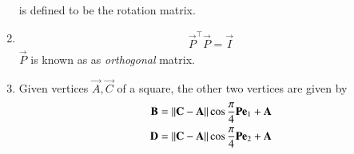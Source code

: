 \begin{enumerate}[label=\thesubsection.\arabic*.,ref=\thesubsection.\theenumi]
\begin{align}
{}
\end{align}
is defined to be the rotation matrix. 
\item 
\begin{align}
	\vec{P}^{\top} \vec{P} = \vec{I}
\end{align}
		$\vec{P}$ is known as as {\em orthogonal} matrix.
\item Given vertices $\vec{A}, \vec{C}$ of a square, the other two vertices are given by
\begin{align}
\begin{split}
	\mathbf{B} = \left\lVert\mathbf{C}-\mathbf{A}\right\rVert\cos \frac{\pi}{4}\mathbf{P}\mathbf{e}_1+\mathbf{A}
	\\
	\mathbf{D} = \left\lVert\mathbf{C}-\mathbf{A}\right\rVert\cos \frac{\pi}{4}\mathbf{P}\mathbf{e}_2+\mathbf{A}
\end{split}
	\label{eq:affine-square-bd}
\end{align}
\iffalse
	\\
		\solution Shifting $\vec{A}$ to the origin and rotating the square clockwise by an angle $\phi$ made by $CA$ with the $x$-axis,
	from \eqref{eq:conic_affine},
\begin{align}
\vec{A} = \vec{P}\vec{0}+\vec{c}
\\
\implies 
\vec{c} = \vec{A}
\\
	\theta =  \phi -\frac{\pi}{4} 
\end{align}
and we obtain a square with the other vertices as
\begin{align}
\begin{split}
	\vec{B}_1 = \norm{\vec{C}-\vec{A}}\cos \frac{\pi}{4}\vec{e}_1
	\\
	\vec{D}_1 = \norm{\vec{C}-\vec{A}}\cos \frac{\pi}{4}\vec{e}_2
\end{split}
	\label{eq:affine-bd}
\end{align}
	From \eqref{eq:conic_affine}
	and 
	\eqref{eq:affine-bd},
	we obtain \eqref{eq:affine-square-bd}.
	\fi
\end{enumerate}
